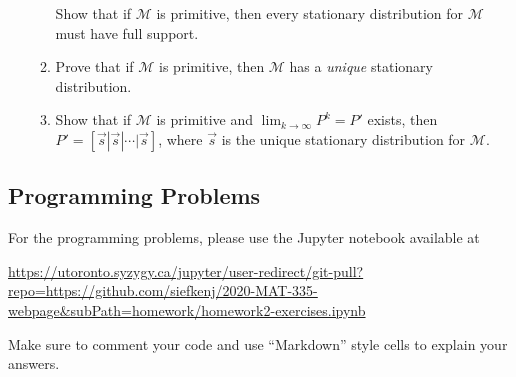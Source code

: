 \documentclass[letter]{article}
\begin{document}
\begin{enumerate}
\begin{enumerate}
				\smallskip
				Show that if $\mathcal M$ is primitive, then every stationary distribution for $\mathcal M$
				must have full support.
			\item Prove that if $\mathcal M$ is primitive, then $\mathcal M$ has a \emph{unique} stationary distribution.
			\item Show that if $\mathcal M$ is primitive and $\lim_{k\to\infty} P^k=P'$ exists, then $P'=[\vec s|\vec s|\cdots|\vec s]$,
				where $\vec s$ is the unique stationary distribution for $\mathcal M$.
		\end{enumerate}


	\end{enumerate}


	\subsection*{Programming Problems}
	For the programming problems, please use the Jupyter notebook available at

	\url{https://utoronto.syzygy.ca/jupyter/user-redirect/git-pull?repo=https://github.com/siefkenj/2020-MAT-335-webpage&subPath=homework/homework2-exercises.ipynb}

	Make sure to comment your code and use ``Markdown'' style cells to explain your answers.
\end{document}
